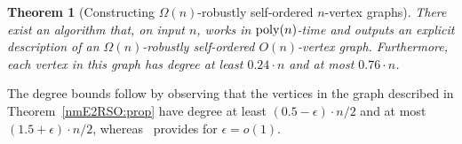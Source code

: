 \documentclass[10pt,a4paper]{article}
\newtheorem{theorem}{Theorem}[section]
\theoremstyle{definition}
\newcommand{\e}{\epsilon}
\newcommand{\BT}{\begin{theorem}}   \newcommand{\ET}{\end{theorem}}
\newcommand{\poly}{{\rm poly}}
\begin{document}
\BT[Constructing $\Omega(n)$-robustly self-ordered $n$-vertex graphs]
\label{dense-rso1:thm}
There exist an algorithm that, on input $n$,
works in $\poly(n)$-time and outputs an explicit description of
an $\Omega(n)$-robustly self-ordered $O(n)$-vertex graph.
Furthermore, each vertex in this graph has degree
at least $0.24\cdot n$ and at most $0.76\cdot n$.
\ET
The degree bounds follow by observing that the vertices
in the graph described in Theorem~\ref{nmE2RSO:prop}
have degree at least $(0.5-\e)\cdot n/2$
and at most $(1.5+\e)\cdot n/2$,
whereas~\cite[Thm.~1]{CGL} provides for $\e=o(1)$.
\end{document}
